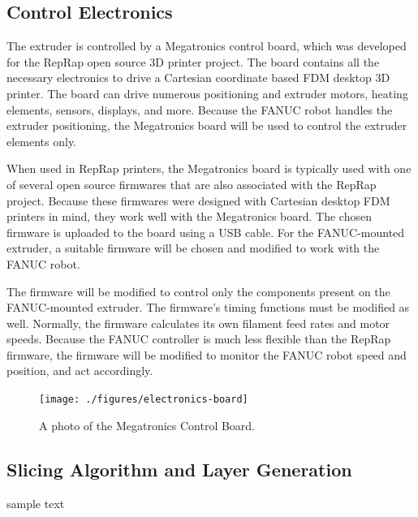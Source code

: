 \clearpage




\subsection{Control Electronics}
\indent 

The extruder is controlled by a Megatronics control board, which was developed for the RepRap open source 3D printer project. The board contains all the necessary electronics to drive a Cartesian coordinate based FDM desktop 3D printer. The board can drive numerous positioning and extruder motors, heating elements, sensors, displays, and more. Because the FANUC robot handles the extruder positioning, the Megatronics board will be used to control the extruder elements only. 

When used in RepRap printers, the Megatronics board is typically used with one of several open source firmwares that are also associated with the RepRap project. Because these firmwares were designed with Cartesian desktop FDM printers in mind, they work well with the Megatronics board. The chosen firmware is uploaded to the board using a USB cable. For the FANUC-mounted extruder, a suitable firmware will be chosen and modified to work with the FANUC robot.

The firmware will be modified to control only the components present on the FANUC-mounted extruder. The firmware's timing functions must be modified as well. Normally, the firmware calculates its own filament feed rates and motor speeds. Because the FANUC controller is much less flexible than the RepRap firmware, the firmware will be modified to monitor the FANUC robot speed and position, and act accordingly. 

\begin{figure}[h!]
\centering
\texttt{[image: ./figures/electronics-board]}
\caption{A photo of the Megatronics Control Board.}
\label{fig:extruder drawing}
\end{figure}

\subsection{Slicing Algorithm and Layer Generation}

\indent

sample text
